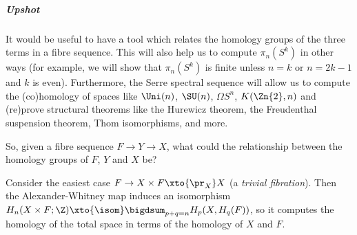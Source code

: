 \documentclass[wip, topology]{bsteffan-lecturenotes}
\begin{document}
\subparagraph{Upshot}
It would be useful to have a tool which relates the homology groups of the three terms in a fibre sequence.
This will also help us to compute $\pi_n(S^k)$ in other ways (for example, we will show that $\pi_n(S^k)$ is finite unless $n = k$ or $n = 2k - 1$ and $k$ is even).
Furthermore, the Serre spectral sequence will allow us to compute the (co)homology of spaces like $\Uni(n)$, $\SU(n)$, $\Omega S^n$, $K(\Zn{2}, n)$ and (re)prove structural theorems like the Hurewicz theorem, the Freudenthal suspension theorem, Thom isomorphisms, and more.

So, given a fibre sequence $F \to Y \to X$, what could the relationship between the homology groups of $F$, $Y$ and $X$ be?
\begin{example}
	Consider the easiest case $F \to X \times F \xto{\pr_X} X$ (a \emph{trivial fibration}).
	Then the Alexander-Whitney map induces an isomorphism $H_n(X \times F; \Z) \xto{\isom} \bigdsum_{p + q = n} H_p(X, H_q(F))$, so it computes the homology of the total space in terms of the homology of $X$ and $F$.
\end{example}
\end{document}
